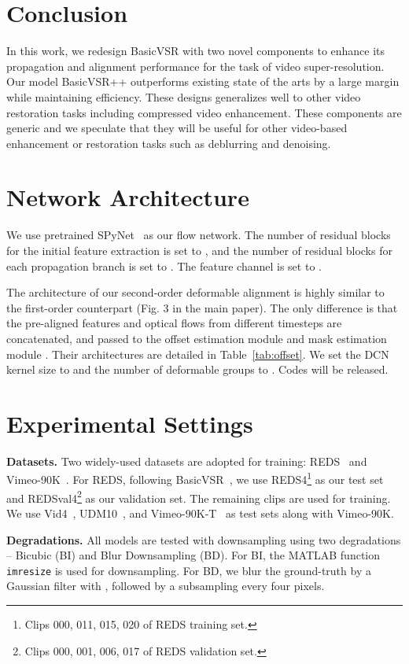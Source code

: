 \documentclass[10pt,twocolumn,letterpaper]{article}
\begin{document}
 \section{Conclusion}
In this work, we redesign BasicVSR with two novel components to enhance its propagation and alignment performance for the task of video super-resolution. Our model BasicVSR++ outperforms existing state of the arts by a large margin while maintaining efficiency. These designs generalizes well to other video restoration tasks including compressed video enhancement. These components are generic and we speculate that they will be useful for other video-based enhancement or restoration tasks such as deblurring and denoising. 
{\small
    
    
}
\appendix
\section{Network Architecture}
We use pretrained SPyNet~\cite{ranjan2017optical} as our flow network. The number of residual blocks for the initial feature extraction is set to , and the number of residual blocks for each propagation branch is set to . The feature channel is set to .

The architecture of our second-order deformable alignment is highly similar to the first-order counterpart (Fig. 3 in the main paper). The only difference is that the pre-aligned features and optical flows from different timesteps are concatenated, and passed to the offset estimation module  and mask estimation module . Their architectures are detailed in Table~\ref{tab:offset}.
We set the DCN kernel size to  and the number of deformable groups to . Codes will be released.

\section{Experimental Settings}
\noindent\textbf{Datasets.}
Two widely-used datasets are adopted for training: REDS~\cite{nah2019ntire} and Vimeo-90K~\cite{xue2019video}.
For REDS, following BasicVSR~\cite{chan2021basicvsr}, we use REDS4\footnote{Clips 000, 011, 015, 020 of REDS training set.} as our test set and REDSval4\footnote{Clips 000, 001, 006, 017 of REDS validation set.} as our validation set. The remaining clips are used for training.
We use Vid4~\cite{liu2014bayesian}, UDM10~\cite{yi2019progressive}, and Vimeo-90K-T~\cite{xue2019video} as test sets along with Vimeo-90K.

\noindent\textbf{Degradations.}
All models are tested with  downsampling using two degradations -- Bicubic (BI) and Blur Downsampling (BD). For BI, the MATLAB function \texttt{imresize} is used for downsampling. For BD, we blur the ground-truth by a Gaussian filter with , followed by a subsampling every four pixels.
\end{document}
